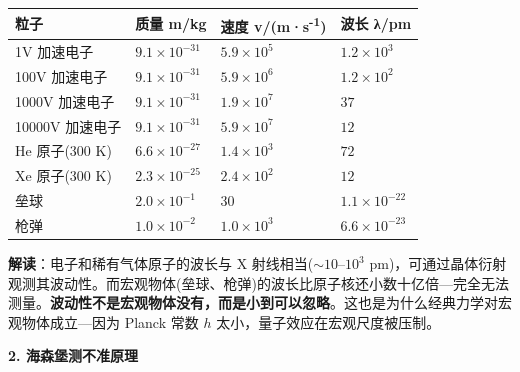 \documentclass[a4paper,11pt]{ctexart}
\newcounter{none}
\newcommand{\箭}{\ensuremath{\rightarrow}}
\newcommand{\左箭}{\ensuremath{\leftarrow}}
\newcommand{\上箭}{\ensuremath{\uparrow}}
\newcommand{\下箭}{\ensuremath{\downarrow}}
\newcommand{\衡}{\ensuremath{\rightleftharpoons}}
\newcommand{\双箭}{\ensuremath{\leftrightarrow}}
\newcommand{\约等于}{\ensuremath{\approx}}
\newcommand{\小于等于}{\ensuremath{\leq}}
\newcommand{\大于等于}{\ensuremath{\geq}}
\newcommand{\不等于}{\ensuremath{\neq}}
\newcommand{\西格马}{\ensuremath{\sigma}}
\newcommand{\派}{\ensuremath{\pi}}
\begin{document}
{\def\LTcaptype{none} %
\begin{longtable}[]{@{}
  >{\raggedright\arraybackslash}p{}
  >{\raggedleft\arraybackslash}p{}
  >{\centering\arraybackslash}p{}
  >{\centering\arraybackslash}p{}@{}}
\toprule\noalign{}
\begin{minipage}[b]{\linewidth}\raggedright
粒子
\end{minipage} & \begin{minipage}[b]{\linewidth}\raggedleft
质量 m/kg
\end{minipage} & \begin{minipage}[b]{\linewidth}\centering
速度 v/(m·s\textsuperscript{-1})
\end{minipage} & \begin{minipage}[b]{\linewidth}\centering
波长 λ/pm
\end{minipage} \\
\midrule\noalign{}
\endhead
\bottomrule\noalign{}
\endlastfoot
1V 加速电子 & \(9.1\times 10^{-31}\) & \(5.9\times 10^5\) & \(1.2\times 10^{3}\) \\
100V 加速电子 & \(9.1\times 10^{-31}\) & \(5.9\times 10^6\) & \(1.2\times 10^{2}\) \\
1000V 加速电子 & \(9.1\times 10^{-31}\) & \(1.9\times 10^7\) & \(37\) \\
10000V 加速电子 & \(9.1\times 10^{-31}\) & \(5.9\times 10^7\) & \(12\) \\
He 原子(300 K) & \(6.6\times 10^{-27}\) & \(1.4\times 10^3\) & \(72\) \\
Xe 原子(300 K) & \(2.3\times 10^{-25}\) & \(2.4\times 10^2\) & \(12\) \\
垒球 & \(2.0\times 10^{-1}\) & \(30\) & \(1.1\times 10^{-22}\) \\
枪弹 & \(1.0\times 10^{-2}\) & \(1.0\times 10^3\) & \(6.6\times 10^{-23}\) \\
\end{longtable}
}

\textbf{解读}：电子和稀有气体原子的波长与 X 射线相当(\(\sim 10\text{–}10^3\) pm)，可通过晶体衍射观测其波动性。而宏观物体(垒球、枪弹)的波长比原子核还小数十亿倍---完全无法测量。\textbf{波动性不是宏观物体没有，而是小到可以忽略}。这也是为什么经典力学对宏观物体成立---因为 Planck 常数 \(h\) 太小，量子效应在宏观尺度被压制。

\textbf{2. 海森堡测不准原理}
\end{document}
